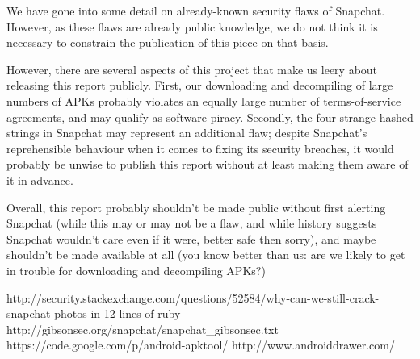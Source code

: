\documentclass[11pt]{article}
\numberwithin{theorem}{subsection}
\begin{document}
We have gone into some detail on already-known security flaws of Snapchat.  However, as these flaws are already public knowledge\cite{snapchatFlaw1}\cite{snapchatFlaw2}, 
we do not think it is necessary to constrain the publication of this piece on that basis.

However, there are several aspects of this project that make us leery about releasing this report publicly.  First, our downloading and decompiling
of large numbers of APKs probably violates an equally large number of terms-of-service agreements, and may qualify as software piracy.  Secondly, 
the four strange hashed strings in Snapchat may represent an additional flaw; despite Snapchat's reprehensible behaviour when it comes to fixing 
its security breaches, it would probably be unwise to publish this report without at least making them aware of it in advance.

Overall, this report probably shouldn't be made public without first alerting Snapchat (while this may or may not be a flaw, and while history
suggests Snapchat wouldn't care even if it were, better safe then sorry), and maybe shouldn't be made available at all (you know better than us: are we
likely to get in trouble for downloading and decompiling APKs?)

\begin{thebibliography}{9}

        http://security.stackexchange.com/questions/52584/why-can-we-still-crack-snapchat-photos-in-12-lines-of-ruby
        http://gibsonsec.org/snapchat/snapchat\_gibsonsec.txt
        https://code.google.com/p/android-apktool/
        http://www.androiddrawer.com/

\end{thebibliography}
\end{document}
